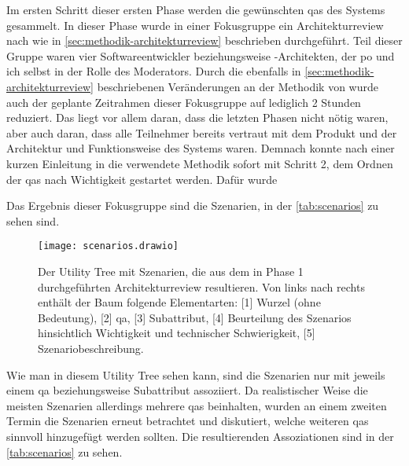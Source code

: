 Im ersten Schritt dieser ersten Phase werden die gewünschten \glspl{qa} des Systems gesammelt.
In dieser Phase wurde in einer Fokusgruppe ein Architekturreview nach  wie in \cref{sec:methodik-architekturreview} beschrieben durchgeführt.
Teil dieser Gruppe waren vier Softwareentwickler beziehungsweise -Architekten, der \acrlong{po} und ich selbst in der Rolle des Moderators.
Durch die ebenfalls in \cref{sec:methodik-architekturreview} beschriebenen Veränderungen an der Methodik von  wurde auch der geplante Zeitrahmen dieser Fokusgruppe auf lediglich 2 Stunden reduziert. Das liegt vor allem daran, dass die letzten Phasen nicht nötig waren, aber auch daran, dass alle Teilnehmer bereits vertraut mit dem Produkt und der Architektur und Funktionsweise des Systems waren.
Demnach konnte nach einer kurzen Einleitung in die verwendete Methodik sofort mit Schritt 2, dem Ordnen der \glspl{qa} nach Wichtigkeit gestartet werden.
Dafür wurde

Das Ergebnis dieser Fokusgruppe sind die Szenarien, in der \cref{tab:scenarios} zu sehen sind.

\begin{landscape}
	\begin{figure}
		\centering
		\texttt{[image: scenarios.drawio]}
		\caption[Utility Tree mit im Architekturreview ermittelten Qualitätsanforderungen und Szenarien]{
			Der Utility Tree mit Szenarien, die aus dem in Phase 1 durchgeführten Architekturreview resultieren.
			Von links nach rechts enthält der Baum folgende Elementarten: [1] Wurzel (ohne Bedeutung), [2] \gls{qa}, [3] Subattribut, [4] Beurteilung des Szenarios hinsichtlich Wichtigkeit und technischer Schwierigkeit, [5] Szenariobeschreibung.
		}
		\label{fig:scenarios}
	\end{figure}
\end{landscape}

Wie man in diesem Utility Tree sehen kann, sind die Szenarien nur mit jeweils einem \gls{qa} beziehungsweise Subattribut assoziiert.
Da realistischer Weise die meisten Szenarien allerdings mehrere \glspl{qa} beinhalten, wurden an einem zweiten Termin die Szenarien erneut betrachtet und diskutiert, welche weiteren \glspl{qa} sinnvoll hinzugefügt werden sollten.
Die resultierenden Assoziationen sind in der \cref{tab:scenarios} zu sehen.

